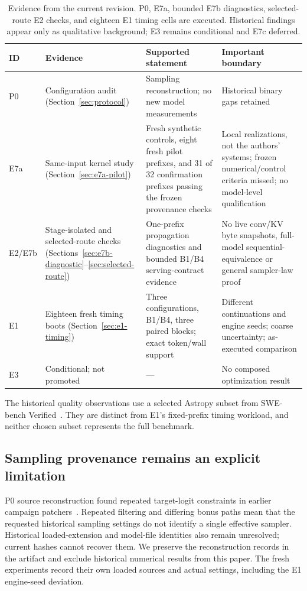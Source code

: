 \documentclass[conference]{IEEEtran}
\begin{document}
\begin{table}[t]
\caption{Evidence from the current revision. P0, E7a, bounded E7b diagnostics, selected-route E2 checks, and eighteen E1 timing cells are executed. Historical findings appear only as qualitative background; E3 remains conditional and E7c deferred.}
\label{tab:evidence}
\centering\footnotesize
\begin{tabularx}{\textwidth}{@{}p{}p{}Yp{0.25\textwidth}@{}}
\toprule
ID & Evidence & Supported statement & Important boundary \\
\midrule
P0 & Configuration audit (Section~\ref{sec:protocol}) & Sampling reconstruction; no new model measurements & Historical binary gaps retained \\
E7a & Same-input kernel study (Section~\ref{sec:e7a-pilot}) & Fresh synthetic controls, eight fresh pilot prefixes, and 31 of 32 confirmation prefixes passing the frozen provenance checks & Local realizations, not the authors' systems; frozen numerical/control criteria missed; no model-level qualification \\
E2/E7b & Stage-isolated and selected-route checks (Sections~\ref{sec:e7b-diagnostic}--\ref{sec:selected-route}) & One-prefix propagation diagnostics and bounded B1/B4 serving-contract evidence & No live conv/KV byte snapshots, full-model sequential-equivalence or general sampler-law proof \\
E1 & Eighteen fresh timing boots (Section~\ref{sec:e1-timing}) & Three configurations, B1/B4, three paired blocks; exact token/wall support & Different continuations and engine seeds; coarse uncertainty; as-executed comparison \\
E3 & Conditional; not promoted & --- & No composed optimization result \\
\bottomrule
\end{tabularx}
\end{table}

The historical quality observations use a selected Astropy subset from SWE-bench Verified~\cite{jimenez2024swe}. They are distinct from E1's fixed-prefix timing workload, and neither chosen subset represents the full benchmark.

\subsection{Sampling provenance remains an explicit limitation}
P0 source reconstruction found repeated target-logit constraints in earlier campaign patchers~\cite{lumo2026levers}. Repeated filtering and differing bonus paths mean that the requested historical sampling settings do not identify a single effective sampler. Historical loaded-extension and model-file identities also remain unresolved; current hashes cannot recover them. We preserve the reconstruction records in the artifact and exclude historical numerical results from this paper. The fresh experiments record their own loaded sources and actual settings, including the E1 engine-seed deviation.
\end{document}
